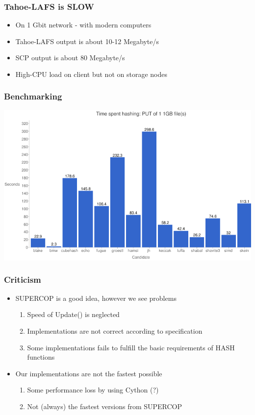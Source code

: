 \documentclass[screen]{beamer}
\begin{document}
\begin{frame}
    \frametitle{Tahoe-LAFS is SLOW}
    \begin{itemize}
        \item On 1 Gbit network - with modern computers
        \item Tahoe-LAFS output is about 10-12 Megabyte/s
        \item SCP output is about 80 Megabyte/s
        \item High-CPU load on client but not on storage nodes
    \end{itemize}
\end{frame}

\begin{frame}
    \frametitle{Benchmarking}

    \includegraphics[width=0.9\columnwidth]{tsh-put-1gb.png}
\end{frame}

\begin{frame}
    \frametitle{Criticism}
    \begin{itemize}
        \item SUPERCOP is a good idea, however we see problems
            \begin{enumerate}
                \item Speed of Update() is neglected
                \item Implementations are not correct according to specification
                \item Some implementations fails to fulfill the basic requirements
                of HASH functions
            \end{enumerate}
        \item Our implementations are not the fastest possible
            \begin{enumerate}
                \item Some performance loss by using Cython (?)
                \item Not (always) the fastest versions from SUPERCOP
            \end{enumerate}
    \end{itemize}
\end{frame}
\end{document}
